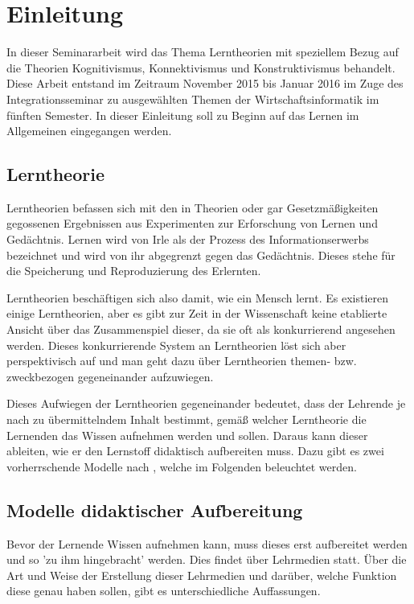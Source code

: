 \chapter{Einleitung}
\label{cha:Einleitung}
In dieser Seminararbeit wird das Thema Lerntheorien mit speziellem Bezug auf die Theorien Kognitivismus, Konnektivismus und Konstruktivismus behandelt. Diese Arbeit entstand im Zeitraum November 2015 bis Januar 2016 im Zuge des Integrationsseminar zu ausgewählten Themen der Wirtschaftsinformatik im fünften Semester. In dieser Einleitung soll zu Beginn auf das Lernen im Allgemeinen eingegangen werden.

\section{Lerntheorie}
\label{sec:Lerntheorie}
Lerntheorien befassen sich mit den in Theorien oder gar Gesetzmäßigkeiten gegossenen Ergebnissen aus Experimenten zur Erforschung von Lernen und Gedächtnis. Lernen wird von Irle als der Prozess des Informationserwerbs bezeichnet und wird von ihr abgegrenzt gegen das Gedächtnis. Dieses stehe für die Speicherung und Reproduzierung des Erlernten. \cite[]{Irle.1986}

Lerntheorien beschäftigen sich also damit, wie ein Mensch lernt. \cite{Reinmann.2013} Es existieren einige Lerntheorien, aber es gibt zur Zeit in der Wissenschaft keine etablierte Ansicht über das Zusammenspiel dieser, da sie oft als konkurrierend angesehen werden. \cite[S. 172 - 173]{Weinert.1996} Dieses konkurrierende System an Lerntheorien löst sich aber perspektivisch auf \cite{WittKerres.2002} und man geht dazu über Lerntheorien themen- bzw. zweckbezogen gegeneinander aufzuwiegen. \cite{Reinmann.2013}

Dieses Aufwiegen der Lerntheorien gegeneinander bedeutet, dass der Lehrende je nach zu übermittelndem Inhalt bestimmt, gemäß welcher Lerntheorie die Lernenden das Wissen aufnehmen werden und sollen. Daraus kann dieser ableiten, wie er den Lernstoff didaktisch aufbereiten muss. Dazu gibt es zwei vorherrschende Modelle nach \cite{Kerres.2001}, welche im Folgenden beleuchtet werden. 

\section{Modelle didaktischer Aufbereitung}
\label{sec:Lernmodelle}
Bevor der Lernende Wissen aufnehmen kann, muss dieses erst aufbereitet werden und so 'zu ihm hingebracht' werden. Dies findet über Lehrmedien statt. Über die Art und Weise der Erstellung dieser Lehrmedien und darüber, welche Funktion diese genau haben sollen, gibt es unterschiedliche Auffassungen.

